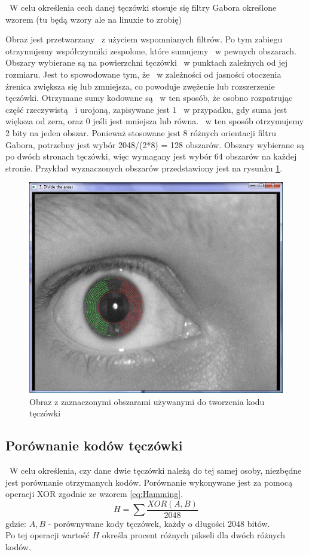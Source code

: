 ~W celu określenia cech danej tęczówki stosuje się filtry Gabora określone wzorem (tu będą wzory ale na linuxie to zrobię)

Obraz jest przetwarzany ~z użyciem wspomnianych filtrów. Po tym zabiegu otrzymujemy współczynniki zespolone, które sumujemy ~w pewnych obszarach. Obszary wybierane są na powierzchni tęczówki ~w punktach zależnych od jej rozmiaru. Jest to spowodowane tym, że ~w zależności od jasności otoczenia źrenica zwiększa się lub zmniejsza, co powoduje zwężenie lub rozszerzenie tęczówki. Otrzymane sumy kodowane są ~w ten sposób, że osobno rozpatrując część rzeczywistą ~i urojoną, zapisywane jest 1 ~w przypadku, gdy suma jest większa od zera, oraz 0 jeśli jest mniejsza lub równa. ~w ten sposób otrzymujemy 2 bity na jeden obszar. Ponieważ stosowane jest 8 różnych orientacji filtru Gabora, potrzebny jest wybór 2048/(2*8) = 128 obszarów. Obszary wybierane są po dwóch stronach tęczówki, więc wymagany jest wybór 64 obszarów na każdej stronie. Przykład wyznaczonych obszarów przedstawiony jest na rysunku \ref{fig:obszaryNasze}.

\begin{figure}
\begin{center}
\includegraphics[scale=0.5]{obszary.jpg}
\caption{Obraz z zaznaczonymi obszarami używanymi do tworzenia kodu tęczówki}
\label{fig:obszaryNasze}
\end{center}
\end{figure}

\subsection{Porównanie kodów tęczówki}
\label{subsec:porownanieKodow}
~W celu określenia, czy dane dwie tęczówki należą do tej samej osoby, niezbędne jest porównanie otrzymanych kodów. Porównanie wykonywane jest za pomocą operacji XOR zgodnie ze wzorem \ref{eq:Hamming}.
\begin{equation}
\label{eq:Hamming}
H = \sum \frac{XOR(A,B)}{2048}
\end{equation}
gdzie:
$A, B$ - porównywane kody tęczówek, każdy o długości 2048 bitów.\\
Po tej operacji wartość $H$ określa procent różnych pikseli dla dwóch różnych kodów.

